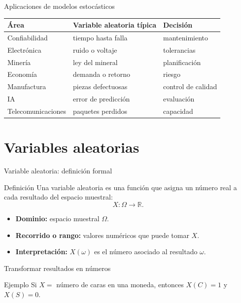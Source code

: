 \documentclass[aspectratio=169,11pt]{beamer}
\begin{document}
\begin{frame}{Aplicaciones de modelos estocásticos}
\small
\begin{tabular}{p{}p{}p{}}
\toprule
Área & Variable aleatoria típica & Decisión \\
\midrule
Confiabilidad & tiempo hasta falla & mantenimiento \\
Electrónica & ruido o voltaje & tolerancias \\
Minería & ley del mineral & planificación \\
Economía & demanda o retorno & riesgo \\
Manufactura & piezas defectuosas & control de calidad \\
IA & error de predicción & evaluación \\
Telecomunicaciones & paquetes perdidos & capacidad \\
\bottomrule
\end{tabular}
\end{frame}

\section{Variables aleatorias}

\begin{frame}{Variable aleatoria: definición formal}
\begin{block}{Definición}
Una variable aleatoria es una función que asigna un número real a cada resultado del espacio muestral:
\[
X:\Omega\to\mathbb{R}.
\]
\end{block}
\pause
\begin{itemize}
  \item \textbf{Dominio:} espacio muestral $\Omega$.
  \item \textbf{Recorrido o rango:} valores numéricos que puede tomar $X$.
  \item \textbf{Interpretación:} $X(\omega)$ es el número asociado al resultado $\omega$.
\end{itemize}
\end{frame}

\begin{frame}{Transformar resultados en números}
\centering
{}
\vspace{0.4em}
\begin{exampleblock}{Ejemplo}
Si $X=$ número de caras en una moneda, entonces $X(C)=1$ y $X(S)=0$.
\end{exampleblock}
\end{frame}
\end{document}
